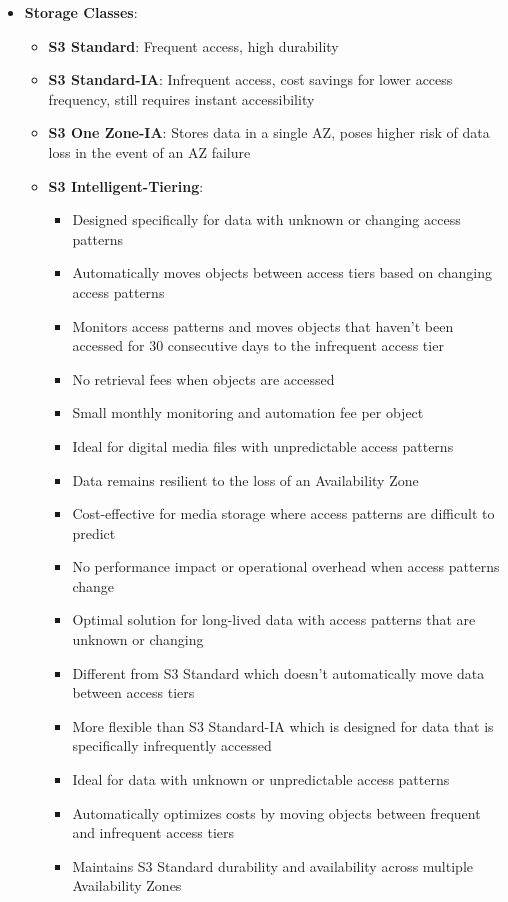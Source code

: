 \documentclass[11pt,a4paper]{report}
\begin{document}
\begin{itemize}
  \item \textbf{Storage Classes}:
\begin{itemize}
  \item \textbf{S3 Standard}: Frequent access, high durability
  \item \textbf{S3 Standard-IA}: Infrequent access, cost savings for lower access frequency, still requires instant accessibility
  \item \textbf{S3 One Zone-IA}: Stores data in a single AZ, poses higher risk of data loss in the event of an AZ failure
  \item \textbf{S3 Intelligent-Tiering}:
\begin{itemize}
  \item Designed specifically for data with unknown or changing access patterns
  \item Automatically moves objects between access tiers based on changing access patterns
  \item Monitors access patterns and moves objects that haven't been accessed for 30 consecutive days to the infrequent access tier
  \item No retrieval fees when objects are accessed
  \item Small monthly monitoring and automation fee per object
  \item Ideal for digital media files with unpredictable access patterns
  \item Data remains resilient to the loss of an Availability Zone
  \item Cost-effective for media storage where access patterns are difficult to predict
  \item No performance impact or operational overhead when access patterns change
  \item Optimal solution for long-lived data with access patterns that are unknown or changing
  \item Different from S3 Standard which doesn't automatically move data between access tiers
  \item More flexible than S3 Standard-IA which is designed for data that is specifically infrequently accessed
  \item Ideal for data with unknown or unpredictable access patterns
  \item Automatically optimizes costs by moving objects between frequent and infrequent access tiers
  \item Maintains S3 Standard durability and availability across multiple Availability Zones

\end{itemize}
\end{itemize}
\end{itemize}
\end{document}
